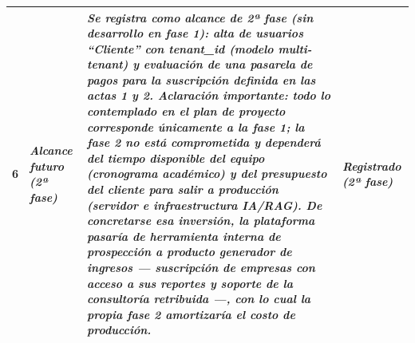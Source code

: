 \documentclass[11pt,a4paper]{article}
\newcommand{\vl}[1]{\textcolor{grisV}{\textit{#1}}}
\begin{document}
{\begin{longtable}{|C{0.8cm}|L{3.0cm}|L{7.6cm}|L{2.8cm}|}
6 & \vl{Alcance futuro (2ª fase)} & \vl{Se registra como alcance de \textbf{2ª fase} (sin desarrollo en fase 1): alta de \textbf{usuarios ``Cliente'' con tenant\_id} (modelo multi-tenant) y evaluación de una \textbf{pasarela de pagos} para la suscripción definida en las actas 1 y 2. \textbf{Aclaración importante:} todo lo contemplado en el plan de proyecto corresponde \textbf{únicamente a la fase 1}; la fase 2 no está comprometida y dependerá del \textbf{tiempo disponible del equipo} (cronograma académico) y del \textbf{presupuesto del cliente para salir a producción} (servidor e infraestructura IA/RAG). De concretarse esa inversión, la plataforma pasaría de herramienta interna de prospección a \textbf{producto generador de ingresos} --- suscripción de empresas con acceso a sus reportes y soporte de la consultoría retribuida ---, con lo cual la propia fase 2 amortizaría el costo de producción.} & \vl{Registrado (2ª fase)} \\ \hline
\end{longtable}}
\end{document}
